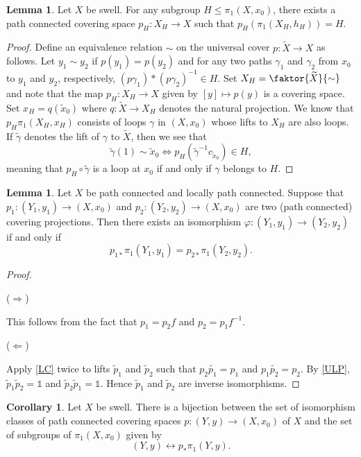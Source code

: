 \documentclass[10pt,letterpaper,cm]{nupset}
\theoremstyle{definition}
\theoremstyle{theorem}
\newtheorem{lemma}[definition]{Lemma}
\newtheorem{corollary}[definition]{Corollary}
\theoremstyle{remark}
\newcommand{\1}{\mathbb{1}}
\newcommand{\0}{\vec 0}
\begin{document}
\begin{lemma}
Let $X$ be swell. For any subgroup $H \leq \pi_1\left(X, x_0\right)$, there exists a path connected covering space $p_H : X_H \to X$ such that $p_H (\pi_1(X_H, h_H)) = H$.
\end{lemma}
\begin{proof}
Define an equivalence relation $\sim$ on the universal cover $p: \widetilde{X} \to X$ as follows. Let $y_1 \sim y_2$ if $p(y_1) = p(y_2)$ and for any two paths $\gamma_1$ and $\gamma_2$ from $x_0$ to $y_1$ and $y_2$, respectively, $\left(p\gamma_1\right)\ast \left(p\gamma_2\right)^{-1}\in H$. Set $X_H = \faktor{\widetilde{X}}{\sim}$ and note that the map $p_H : X_H \to X$ given by $\left[y\right] \mapsto p(y)$ is a covering space. Set $x_H= q(\tilde{x}_0)$ where $q: \widetilde{X} \to X_H$ denotes the natural projection. We know that $p_H \pi_1(X_H, x_H)$ consists of loops $\gamma$ in $\left(X, x_0\right)$ whose lifts to $X_H$ are also loops.  If $\tilde{\gamma}$ denotes the lift of $\gamma$ to $\widetilde{X}$, then we see that $$\tilde{\gamma}(1) \sim \tilde{x}_0 \iff p_H(\tilde{\gamma}^{-1} c_{\tilde{x} _0}) \in H,$$ meaning that  $p_H \circ \tilde{\gamma}$ is a loop at $x_0$ if and only if $\gamma$ belongs to $H$.
\end{proof}

\begin{lemma}
Let $X$ be path connected and locally path connected. Suppose that $p_1:(Y_1, y_1) \to \left(X, x_0\right)$ and $p_2 : (Y_2, y_2) \to \left(X, x_0\right)$ are two (path connected) covering projections. Then there exists an isomorphism $\varphi : (Y_1, y_1) \to (Y_2, y_2)$ if and only if  $$p_{1\ast} \pi_1(Y_1, y_1) = p_{2 \ast} \pi_1(Y_2, y_2).$$
\end{lemma}
\begin{proof} $ $
\smallskip

 ($\Longrightarrow$)

This follows from the fact that $p_1 = p_2f$ and $p_2 = p_1f^{-1}$. 

\medskip

 ($\Longleftarrow$) 
 
 Apply \cref{LC} twice to lifts $\tilde{p}_1$ and $\tilde{p}_2$ such that $p_2\tilde{p_1} = p_1$ and $p_1\tilde{p_2}=p_2$. By \cref{ULP}, $\tilde{p}_1\tilde{p}_2=\1$ and $\tilde{p}_2\tilde{p}_1 = \1$. Hence $\tilde{p}_1$ and $\tilde{p}_2$ are inverse isomorphisms. 
\end{proof}

\begin{corollary}
Let $X$ be swell. There is a bijection between the set of isomorphism classes of path connected covering spaces $p: (Y, y) \to \left(X, x_0\right)$ of $X$ and the set of subgroups of $\pi_1\left(X, x_0\right)$ given by $$\left(Y, y\right) \longleftrightarrow p_{\ast}\pi_1(Y, y)    .$$
\end{corollary}
\end{document}
